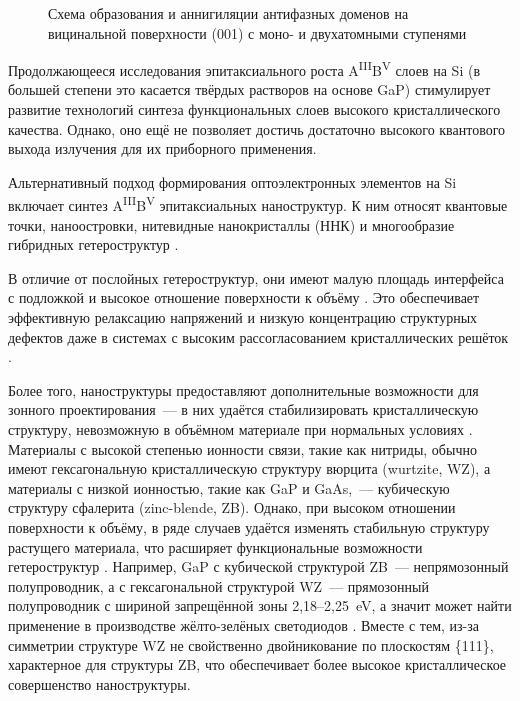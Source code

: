 \begin{figure}[ht] 
\caption{Схема образования и аннигиляции антифазных доменов на вицинальной
поверхности (001) с моно- и двухатомными ступенями}
\label{fig:Image_2}
\end{figure}

Продолжающееся исследования эпитаксиального роста
A\textsuperscript{III}B\textsuperscript{V} слоев на Si (в большей степени это
касается твёрдых растворов на основе GaP) стимулирует развитие технологий
синтеза функциональных слоев высокого кристаллического качества. Однако, оно
ещё не позволяет достичь достаточно высокого квантового выхода излучения для их
приборного применения.

Альтернативный подход формирования оптоэлектронных элементов на Si включает
синтез A\textsuperscript{III}B\textsuperscript{V} эпитаксиальных наноструктур.
К ним относят квантовые точки, наноостровки, нитевидные нанокристаллы (ННК) и
многообразие гибридных гетероструктур \cite{Tan2018}.

В отличие от послойных гетероструктур, они имеют малую площадь интерфейса с
подложкой и высокое отношение поверхности к объёму \cite{Bolshakov2013,
Tchernycheva2007}. Это обеспечивает эффективную релаксацию напряжений и низкую
концентрацию структурных дефектов даже в системах с высоким рассогласованием
кристаллических решёток \cite{Samsonenko2011}.

Более того, наноструктуры предоставляют дополнительные возможности для зонного
проектирования~--- в них удаётся стабилизировать кристаллическую структуру,
невозможную в объёмном материале при нормальных условиях \cite{Mohseni2009}.
Материалы с высокой степенью ионности связи, такие как нитриды, обычно имеют
гексагональную кристаллическую структуру вюрцита (wurtzite, WZ), а материалы с
низкой ионностью, такие как GaP и GaAs,~--- кубическую структуру сфалерита
(zinc-blende, ZB). Однако, при высоком отношении поверхности к объёму, в ряде
случаев удаётся изменять стабильную структуру растущего материала, что
расширяет функциональные возможности гетероструктур \cite{Spirkoska2009}.
Например, GaP с кубической структурой ZB~--- непрямозонный полупроводник, а с
гексагональной структурой WZ~--- прямозонный полупроводник с шириной
запрещённой зоны 2,18--2,25~\si{\electronvolt}, а значит может найти применение
в производстве жёлто-зелёных светодиодов \cite{Assali2013}. Вместе с тем, из-за
симметрии структуре WZ не свойственно двойникование по плоскостям \{111\},
характерное для структуры ZB, что обеспечивает более высокое кристаллическое
совершенство наноструктуры.

